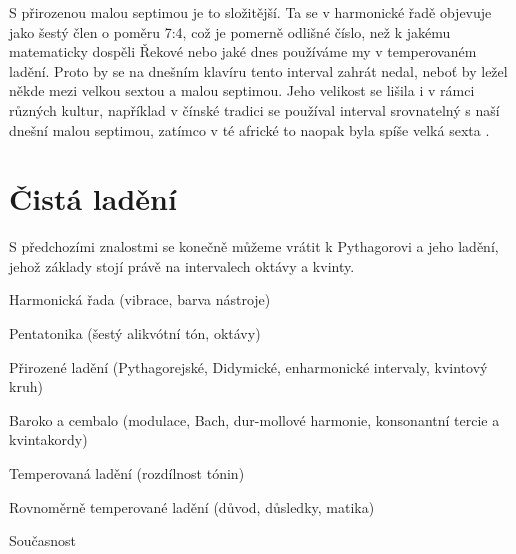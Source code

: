 \documentclass[12pt]{article}
\begin{document}
S přirozenou malou septimou je to složitější. Ta se v harmonické řadě objevuje jako šestý člen o poměru 7:4, což je pomerně odlišné číslo, než k jakému matematicky dospěli Řekové nebo jaké dnes používáme my v temperovaném ladění. Proto by se na dnešním klavíru tento interval zahrát nedal, neboť by ležel někde mezi velkou sextou a malou septimou. Jeho velikost se lišila i v rámci různých kultur, například v čínské tradici se používal interval srovnatelný s naší dnešní malou septimou, zatímco v té africké to naopak byla spíše velká sexta \cite{bernstein}.

\section{Čistá ladění}

S předchozími znalostmi se konečně můžeme vrátit k Pythagorovi a jeho ladění, jehož základy stojí právě na intervalech oktávy a kvinty.  

\pagebreak

Harmonická řada (vibrace, barva nástroje)

Pentatonika (šestý alikvótní tón, oktávy)

Přirozené ladění (Pythagorejské, Didymické, enharmonické intervaly, kvintový kruh)

Baroko a cembalo (modulace, Bach, dur-mollové harmonie, konsonantní tercie a kvintakordy)

Temperovaná ladění (rozdílnost tónin)

Rovnoměrně temperované ladění (důvod, důsledky, matika)

Současnost


{}

\end{document}
